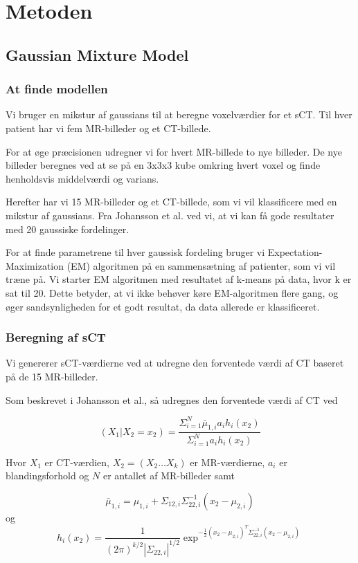 \section{Metoden}
\subsection{Gaussian Mixture Model}

\subsubsection{At finde modellen}
Vi bruger en mikstur af gaussians til at beregne voxelværdier
for et sCT. Til hver patient har vi fem MR-billeder og et CT-billede.

For at øge præcisionen udregner vi for hvert MR-billede
to nye billeder. De nye billeder beregnes ved at se på en 3x3x3
kube omkring hvert voxel og finde henholdsvis middelværdi og varians.

Herefter har vi 15 MR-billeder og et CT-billede, som vi vil klassificere
med en mikstur af gaussians. Fra Johansson et al. ved vi, at vi kan få
gode resultater med 20 gaussiske fordelinger. 

For at finde parametrene til hver gaussisk fordeling bruger vi
Expecta\-tion-Maximization (EM) algoritmen på en sammensætning af patienter, som
vi vil træne på. Vi starter EM algoritmen med resultatet af k-means på
data, hvor k er sat til 20. Dette betyder, at vi ikke behøver køre
EM-algoritmen flere gang, og øger sandsynligheden for et godt resultat, da
data allerede er klassificeret.

\subsubsection{Beregning af sCT}

Vi genererer sCT-værdierne ved at udregne den forventede værdi af CT baseret på de 15 MR-billeder. 

Som beskrevet i Johansson et al., så udregnes den forventede værdi af CT ved

\begin{equation}
(X_1 | X_2 = x_2) = \frac{\Sigma^{N}_{i=1} \bar{\mu}_{1,i} a_i h_i(x_2)}{\Sigma^{N}_{i=1} a_i h_i(x_2)}
\end{equation}

Hvor $X_1$ er CT-værdien, $X_2 = (X_2 \dots X_k)$ er MR-værdierne, $a_i$ er blandingsforhold og $N$ er antallet af MR-billeder samt

\begin{equation}
 \bar{\mu}_{1,i} = \mu_{1,i} + \Sigma_{1 2, i} \Sigma^{-1}_{22, i}(x_2 - \mu_{2,i})
\end{equation}
og
\begin{equation}
h_i(x_2)= \frac{1}{( 2 \pi )^{k/2}|\Sigma_{22,i}|^{1/2}}\exp^{-\frac{1}{2}(x_2 - \mu_{2,i})^T \Sigma^{-1}_{22, i}(x_2 - \mu_{2,i})}
\end{equation}

